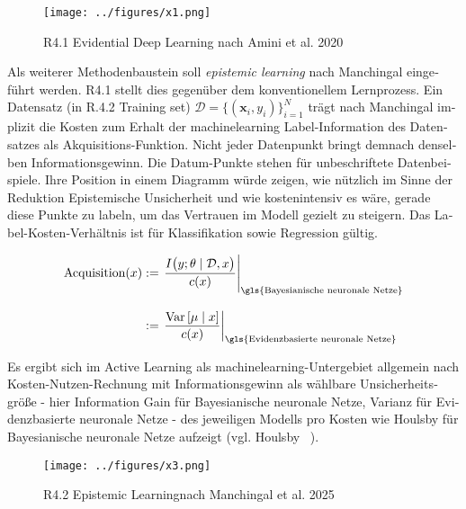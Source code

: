 \begin{otherlanguage}{ngerman}
\begin{figure}[!ht]
  \centering
  \texttt{[image: ../figures/x1.png]}
  \caption{R4.1 \glqq Evidential Deep Learning\grqq{} nach Amini et al. 2020}
\end{figure}

Als weiterer Methodenbaustein soll \glqq{}\textit{epistemic learning}\grqq{} nach Manchingal eingeführt werden. R4.1 stellt dies gegenüber dem konventionellem Lernprozess. Ein Datensatz (in R.4.2 \glqq{}Training set\grqq{}) $\mathcal{D} = \{ (\mathbf{x}_i, y_i) \}_{i=1}^N$ trägt nach Manchingal implizit die Kosten zum Erhalt der \gls{machinelearning} Label-Information des Datensatzes als Akquisitions-Funktion. Nicht jeder Datenpunkt bringt demnach denselben Informationsgewinn. Die \glqq{}Datum\grqq{}-Punkte stehen für unbeschriftete Datenbeispiele. Ihre Position in einem Diagramm würde zeigen, wie nützlich im Sinne der Reduktion \gls{Epistemische Unsicherheit} und wie kostenintensiv es wäre, gerade diese Punkte zu labeln, um das Vertrauen im Modell gezielt zu steigern. Das Label-Kosten-Verhältnis ist für Klassifikation sowie Regression gültig. 

\begin{align*}
\text{Acquisition}(x)
&:=
\left.
\frac{
I\bigl(y ; \theta \mid \mathcal{D}, x \bigr)
}{
c(x)
}
\right|_{\text{\gls{Bayesianische neuronale Netze}}}
\\[2ex]
&:=
\left.
\frac{
\mathrm{Var}\left[ \mu \mid x \right]
}{
c(x)
}
\right|_{\text{\gls{Evidenzbasierte neuronale Netze}}}
\end{align*}

Es ergibt sich im Active Learning als \gls{machinelearning}-Untergebiet allgemein nach Kosten-Nutzen-Rechnung mit Informationsgewinn als wählbare Unsicherheitsgröße - hier Information Gain für \gls{Bayesianische neuronale Netze}, Varianz für \gls{Evidenzbasierte neuronale Netze} - des jeweiligen Modells pro Kosten wie Houlsby für \gls{Bayesianische neuronale Netze} aufzeigt (vgl. Houlsby ~\parencite[S.9 \glqq{}Bayesian active learning by disagreement (BALD)\grqq{}]{houlsby2011bayesian}). 

\begin{figure}[!ht]
  \centering
  \texttt{[image: ../figures/x3.png]}
  \caption{R4.2 \glqq Epistemic Learning\grqq nach Manchingal et al. 2025}
\end{figure}


\end{otherlanguage}
